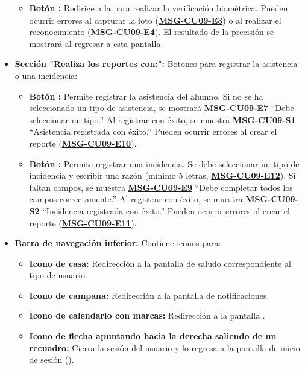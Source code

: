 \begin{itemize}
\begin{itemize}
		\item \textbf{Botón :} Redirige a la  para realizar la verificación biométrica. Pueden ocurrir errores al capturar la foto (\textbf{\hyperref[msg:CU09-E3]{MSG-CU09-E3}}) o al realizar el reconocimiento (\textbf{\hyperref[msg:CU09-E4]{MSG-CU09-E4}}). El resultado de la precisión se mostrará al regresar a esta pantalla.
	\end{itemize}
	\item \textbf{Sección "Realiza los reportes con:":} Botones para registrar la asistencia o una incidencia:
	\begin{itemize}
		\item \textbf{Botón :} Permite registrar la asistencia del alumno. Si no se ha seleccionado un tipo de asistencia, se mostrará \textbf{\hyperref[msg:CU09-E7]{MSG-CU09-E7}} ``Debe seleccionar un tipo.'' Al registrar con éxito, se muestra \textbf{\hyperref[msg:CU09-S1]{MSG-CU09-S1}} ``Asistencia registrada con éxito.'' Pueden ocurrir errores al crear el reporte (\textbf{\hyperref[msg:CU09-E10]{MSG-CU09-E10}}).
		\item \textbf{Botón :} Permite registrar una incidencia. Se debe seleccionar un tipo de incidencia y escribir una razón (mínimo 5 letras, \textbf{\hyperref[msg:CU09-E12]{MSG-CU09-E12}}). Si faltan campos, se muestra \textbf{\hyperref[msg:CU09-E9]{MSG-CU09-E9}} ``Debe completar todos los campos correctamente.'' Al registrar con éxito, se muestra \textbf{\hyperref[msg:CU09-S2]{MSG-CU09-S2}} ``Incidencia registrada con éxito.'' Pueden ocurrir errores al crear el reporte (\textbf{\hyperref[msg:CU09-E11]{MSG-CU09-E11}}).
	\end{itemize}
	\item \textbf{Barra de navegación inferior:} Contiene iconos para:
	\begin{itemize}
		\item \textbf{Icono de casa:} Redirección a la pantalla de saludo correspondiente al tipo de usuario.
		\item \textbf{Icono de campana:} Redirección a la pantalla de notificaciones.
		\item \textbf{Icono de calendario con marcas:} Redirección a la pantalla .
		\item \textbf{Icono de flecha apuntando hacia la derecha saliendo de un recuadro:} Cierra la sesión del usuario y lo regresa a la pantalla de inicio de sesión ().
	\end{itemize}
\end{itemize}

